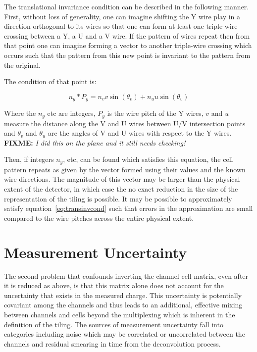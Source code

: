 \documentclass[letter]{article}
\newcommand\fixme[1]{\textbf{FIXME:} \textit{#1}\xspace}
\begin{document}
The translational invariance condition can be described in the
following manner.
First, without loss of generality, one can imagine shifting the Y wire
play in a direction orthogonal to its wires so that one can form at
least one triple-wire crossing between a Y, a U and a V wire.
If the pattern of wires repeat then from that point one can imagine
forming a vector to another triple-wire crossing which occurs such
that the pattern from this new point is invariant to the pattern from
the original.

The condition of that point is:

\begin{equation}
  \label{eq:transinvcond}
  n_y*P_y = n_v v \sin(\theta_v) + n_u u \sin(\theta_v)
\end{equation}

Where the $n_y$ etc are integers, $P_y$ is the wire pitch of the Y
wires, $v$ and $u$ measure the distance along the V and U wires
between U/V intersection points and $\theta_v$ and $\theta_u$ are the
angles of V and U wires with respect to the Y wires.
\fixme{I did this
  on the plane and it still needs checking!}
  
Then, if integers $n_y$, etc, can be found which satisfies this
equation, the cell pattern repeats as given by the vector formed using
their values and the known wire directions.
The magnitude of this vector may be larger than the physical extent of
the detector, in which case the no exact reduction in the size of the
representation of the tiling is possible.
It may be possible to approximately satisfy
equation~\ref{eq:transinvcond} such that errors in the approximation
are small compared to the wire pitches across the entire physical extent.



\section{Measurement Uncertainty}
\label{sec:chargeunc}

The second problem that confounds inverting the channel-cell matrix,
even after it is reduced as above, is that this matrix alone does not
account for the uncertainty that exists in the measured charge.
This uncertainty is potentially covariant among the channels and thus
leads to an additional, effective mixing between channels and cells
beyond the multiplexing which is inherent in the definition of the
tiling.
The sources of measurement uncertainty fall into categories including
noise which may be correlated or uncorrelated between the channels and
residual smearing in time from the deconvolution process.
\end{document}
